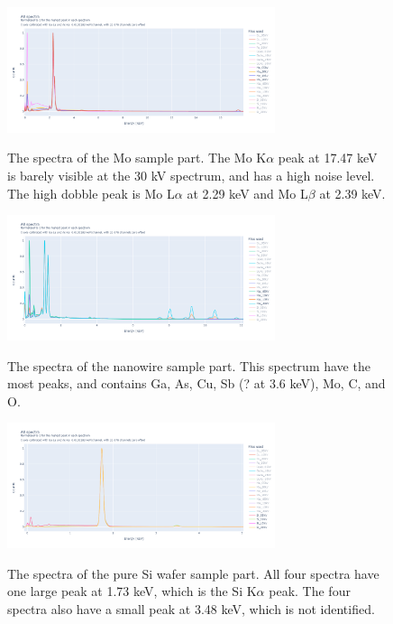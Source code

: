 \begin{figure}
    \centering
    \includegraphics[width=0.70\textwidth]{figures/Spectra_Mo.png}
    \label{fig:Spectra_Mo}
    \caption{
        The spectra of the Mo sample part.
        The Mo K$\alpha$ peak at 17.47 keV is barely visible at the 30 kV spectrum, and has a high noise level.
        The high dobble peak is Mo L$\alpha$ at 2.29 keV and Mo L$\beta$ at 2.39 keV.
    }
\end{figure}

\begin{figure}
    \centering
    \includegraphics[width=0.70\textwidth]{figures/Spectra_NW.png}
    \label{fig:Spectra_NW}
    \caption{
        The spectra of the nanowire sample part.
        This spectrum have the most peaks, and contains Ga, As, Cu, Sb (? at 3.6 keV), Mo, C, and O.
    }
\end{figure}

\begin{figure}
    \centering
    \includegraphics[width=0.70\textwidth]{figures/Spectra_Si.png}
    \label{fig:Spectra_Si}
    \caption{
        The spectra of the pure Si wafer sample part.
        All four spectra have one large peak at 1.73 keV, which is the Si K$\alpha$ peak.
        The four spectra also have a small peak at 3.48 keV, which is not identified.
    }
\end{figure}
